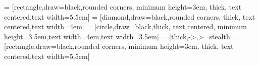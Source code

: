 

\usepackage{tikz}
\usetikzlibrary{
	automata,
	arrows,
	shapes,
	trees,
}



 = [rectangle,draw=black,rounded corners, minimum height=3em, thick, text centered,text width=5.5em]
 = [diamond,draw=black,rounded corners, thick, text centered,text width=4em]
 = [circle,draw=black,thick, text centered, minimum height=3.5em,text width=4em,text width=3.5em]
 = [thick,->,>=stealth]
%
 = [rectangle,draw=black,rounded corners, minimum height=3em, thick, text centered,text width=5.5em]





